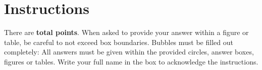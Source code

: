 \section*{Instructions}

There are {\bf 
{} total points}.
When asked to provide your answer within a figure or table, be careful to not
exceed box boundaries. Bubbles must be filled out completely: 
 
All answers must be given within the provided circles, answer boxes,
figures or tables. 
Write your full name in the box to acknowledge the instructions. 
\eprob

